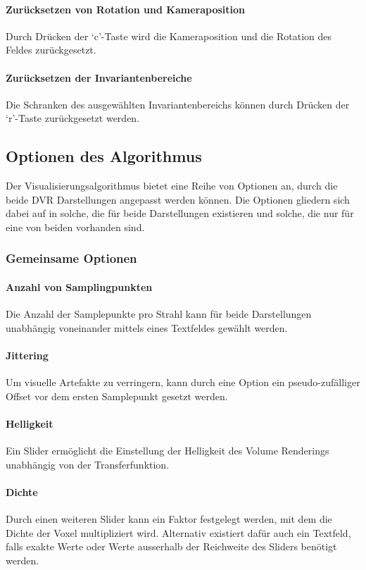 \documentclass[a4paper,fontsize=12pt,toc=bib,halfparskip,ngerman]{scrartcl}
\begin{document}
\paragraph{Zur\"ucksetzen von Rotation und Kameraposition}
Durch Dr\"ucken der `c'-Taste wird die Kameraposition und die Rotation des Feldes zur\"uckgesetzt.
\paragraph{Zur\"ucksetzen der Invariantenbereiche}
Die Schranken des ausgew\"ahlten Invariantenbereichs k\"onnen durch Dr\"ucken der `r'-Taste zur\"uckgesetzt werden.

\subsection{Optionen des Algorithmus}
\label{Options}

Der Visualisierungsalgorithmus bietet eine Reihe von Optionen an, durch die beide DVR Darstellungen angepasst werden k\"onnen. Die Optionen gliedern sich dabei auf in solche, die f\"ur beide Darstellungen existieren und solche, die nur f\"ur eine von beiden vorhanden sind. 

\subsubsection{Gemeinsame Optionen}

\paragraph{Anzahl von Samplingpunkten}
Die Anzahl der Samplepunkte pro Strahl kann f\"ur beide Darstellungen unabh\"angig voneinander mittels eines Textfeldes gew\"ahlt werden.

\paragraph{Jittering}
Um visuelle Artefakte zu verringern, kann durch eine Option ein pseudo-zuf\"alliger Offset vor dem ersten Samplepunkt gesetzt werden.

\paragraph{Helligkeit}
Ein Slider erm\"oglicht die Einstellung der Helligkeit des Volume Renderings unabh\"angig von der Transferfunktion.

\paragraph{Dichte}
Durch einen weiteren Slider kann ein Faktor festgelegt werden, mit dem die Dichte der Voxel multipliziert wird. Alternativ existiert daf\"ur auch ein Textfeld, falls exakte Werte oder Werte ausserhalb der Reichweite des Sliders ben\"otigt werden.
\end{document}
